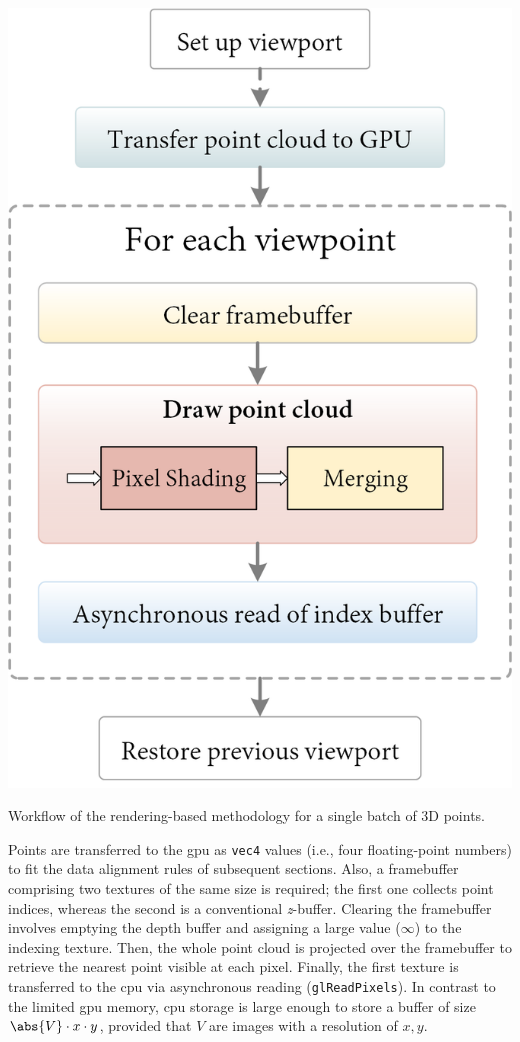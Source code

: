 \begin{marginfigure}[.2cm]
    \centering
    \includegraphics[width=\linewidth]{figs/multi_thermal_projection/occlusion_opengl.png}
    \caption{Workflow of the rendering-based methodology for a single batch of 3D points.}
    \label{fig:occlusion_opengl_zbuffer}
\end{marginfigure}
Points are transferred to the \acrshort{gpu} as \verb|vec4| values (i.e., four floating-point numbers) to fit the data alignment rules of subsequent sections. Also, a framebuffer comprising two textures of the same size is required; the first one collects point indices, whereas the second is a conventional \textit{z}-buffer. Clearing the framebuffer involves emptying the depth buffer and assigning a large value ($\infty$) to the indexing texture. Then, the whole point cloud is projected over the framebuffer to retrieve the nearest point visible at each pixel. Finally, the first texture is transferred to the \acrshort{cpu} via asynchronous reading (\verb|glReadPixels|). In contrast to the limited \acrshort{gpu} memory, \acrshort{cpu} storage is large enough to store a buffer of size $\abs{V} \cdot x \cdot y$, provided that $V$ are images with a resolution of $x, y$.

